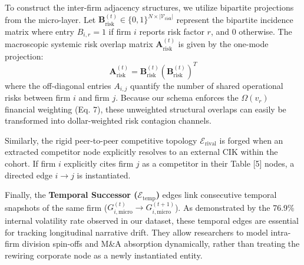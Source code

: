 To construct the inter-firm adjacency structures, we utilize bipartite projections from the micro-layer. Let $\mathbf{B}_{\text{risk}}^{(t)} \in \{0,1\}^{N \times |\mathcal{V}_{\text{risk}}|}$ represent the bipartite incidence matrix where entry $B_{i,r} = 1$ if firm $i$ reports risk factor $r$, and $0$ otherwise. The macroscopic systemic risk overlap matrix $\mathbf{A}_{\text{risk}}^{(t)}$ is given by the one-mode projection:
\begin{equation}
    \mathbf{A}_{\text{risk}}^{(t)} = \mathbf{B}_{\text{risk}}^{(t)} (\mathbf{B}_{\text{risk}}^{(t)})^T
\end{equation}
where the off-diagonal entries $A_{i,j}$ quantify the number of shared operational risks between firm $i$ and firm $j$. Because our schema enforces the $\Omega(v_r)$ financial weighting (Eq. 7), these unweighted structural overlaps can easily be transformed into dollar-weighted risk contagion channels.

Similarly, the rigid peer-to-peer competitive topology $\mathcal{E}_{\text{rival}}$ is forged when an extracted competitor node explicitly resolves to an external CIK within the cohort. If firm $i$ explicitly cites firm $j$ as a competitor in their Table [5] nodes, a directed edge $i \rightarrow j$ is instantiated. 

Finally, the \textbf{Temporal Successor ($\mathcal{E}_{\text{temp}}$)} edges link consecutive temporal snapshots of the same firm ($G_{i,\text{micro}}^{(t)} \rightarrow G_{i,\text{micro}}^{(t+1)}$). As demonstrated by the 76.9\% internal volatility rate observed in our dataset, these temporal edges are essential for tracking longitudinal narrative drift. They allow researchers to model intra-firm division spin-offs and M\&A absorption dynamically, rather than treating the rewiring corporate node as a newly instantiated entity.